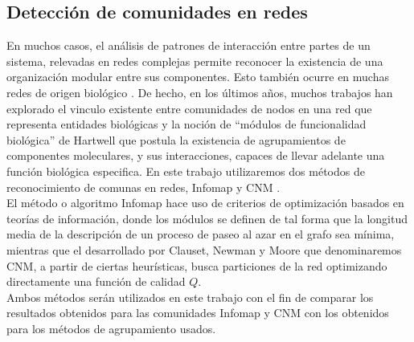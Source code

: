 \subsection{Detección de comunidades en redes}
\label{sec:comunidades}
En muchos casos, el análisis de patrones de interacción entre partes de un sistema, relevadas en redes complejas permite reconocer la existencia de una organización modular entre sus componentes. Esto también ocurre en muchas redes de origen biológico \cite{Barabasi2004}. De hecho, en los últimos años, muchos trabajos han explorado el vinculo existente entre comunidades de nodos en una red que representa entidades biológicas y la noción de ``módulos de funcionalidad biológica'' de Hartwell \cite{Hartwell1999} que postula la existencia de agrupamientos de componentes moleculares, y sus interacciones, capaces de llevar adelante una función biológica especifica. En este trabajo utilizaremos dos métodos de reconocimiento de comunas en redes, Infomap \cite{Rosvall2008} y CNM \cite{Clauset2004}.\\
El método o algoritmo Infomap hace uso de criterios de optimización basados en teorías de información, donde los módulos se definen de tal forma que la longitud media de la descripción de un proceso de paseo al azar en el grafo sea mínima, mientras que el desarrollado por Clauset, Newman y Moore que denominaremos CNM, a partir de ciertas heurísticas, busca particiones de la red optimizando directamente una función de calidad $Q$.\\
Ambos métodos serán utilizados en este trabajo con el fin de comparar los resultados obtenidos para las comunidades Infomap y CNM con los obtenidos para los métodos de agrupamiento usados.\cite{Berenstein2014, Rosvall2008}\\
